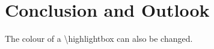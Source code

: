 \documentclass[14pt,landscape,color=UCLdarkred,margin=3cm]{uclposter}
\begin{document}
\begin{multicols}{3}
\begin{figure}[H]
   
\end{figure}



\columnbreak

\section*{Conclusion and Outlook}

\begin{highlightbox}
	The colour of a \textbackslash highlightbox can also be changed.
\end{highlightbox}



\end{multicols}
	
\end{document}
